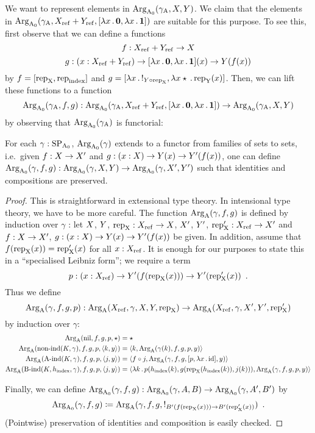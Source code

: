 \documentclass{article}
\begin{document}
We want to represent elements in $\text{Arg}_{\mathrm{A}_0}(\gamma_{\mathrm{A}}, X, Y)$. We claim that
the elements in $\text{Arg}_{\mathrm{A}_0}(\gamma_{\mathrm{A}}, X_{\mathrm{ref}} + Y_{\mathrm{ref}}, [\lambda x\,.\,\mathbf{0},
\lambda x\,.\,\mathbf{1}])$ are suitable for this purpose. To see this,
first observe that we can define a functions
\[
f : X_{\mathrm{ref}} + Y_{\mathrm{ref}} \to X
\]
%
%
\[
g : (x : X_{\mathrm{ref}} + Y_{\mathrm{ref}}) \to
    [\lambda x\,.\,\mathbf{0}, \lambda x\,.\,\mathbf{1}](x)
      \to Y(f(x))
\]
%
by $f = [\text{rep}_{\mathrm{X}}, \text{rep}_{\mathrm{index}}]$ and $g = [\lambda x\,.\,!_{Y \circ
  \text{rep}_{\mathrm{X}}}, \lambda x \star\,.\, \text{rep}_{\mathrm{Y}}(x)]$. Then, we can lift these
functions to a function
%
\[
\text{Arg}_{\mathrm{A}_0}(\gamma_{\mathrm{A}}, f, g) : \text{Arg}_{\mathrm{A}_0}(\gamma_{\mathrm{A}}, X_{\mathrm{ref}} +Y_{\mathrm{ref}}, [\lambda x\,.\,\mathbf{0}, \lambda x\,.\,\mathbf{1}]) \to
                       \text{Arg}_{\mathrm{A}_0}(\gamma_{\mathrm{A}}, X, Y)
\]
%
by observing that $\text{Arg}_{\mathrm{A}_0}(\gamma_{\mathrm{A}})$ is functorial:

\begin{lemma} %
  For each $\gamma : \text{SP}_{\mathrm{A}_0}$, $\text{Arg}_{\mathrm{A}_0}(\gamma)$ extends to a functor from
  families of sets to sets, i.e.\ given $f : X \to X'$ and $g : (x :
  X) \to Y(x) \to Y'(f(x))$, one can define $\text{Arg}_{\mathrm{A}_0}(\gamma, f, g) :
  \text{Arg}_{\mathrm{A}_0}(\gamma, X, Y) \to \text{Arg}_{\mathrm{A}_0}(\gamma, X', Y')$ such that identities
  and compositions are preserved.
\end{lemma}
\begin{proof}
  This is straightforward in extensional type theory. In intensional
  type theory, we have to be more careful. The function $\text{Arg}_{\mathrm{A}}(\gamma,
  f, g)$ is defined by induction over $\gamma$%
: let $X$,
  $Y$, $\text{rep}_{\mathrm{X}} : X_{\mathrm{ref}} \to X$, $X'$, $Y'$, $\text{rep}_{\mathrm{X}}' : X_{\mathrm{ref}} \to X'$ and
  $f : X \to X'$, $g : (x : X) \to Y(x) \to Y'(f(x))$ be given. In
  addition, assume that $f(\text{rep}_{\mathrm{X}}(x)) = \text{rep}_{\mathrm{X}}'(x)$ for all $x :
  X_{\mathrm{ref}}$. It is enough for our purposes to state this in a
  ``specialised Leibniz form''; we require a term
  \[
  p : (x : X_{\mathrm{ref}}) \to Y'(f(\text{rep}_{\mathrm{X}}(x))) \to Y'(\text{rep}_{\mathrm{X}}'(x)) \enspace .
  \]
  Thus we define
  \[
  \ArgA(\gamma, f, g, p) : %
  \ArgA(\Xref, \gamma, \A, \B, \repA)
  \to \ArgA(\Xref, \gamma, \A', \B', \repA')
  \]
  by induction over $\gamma$:
  \begin{align*}
    \text{Arg}_{\mathrm{A}}(\text{nil}, f, g, p, \star) &= \star\\
    \text{Arg}_{\mathrm{A}}(\text{non-ind}(K, \gamma), f, g, p, \langle k , y\rangle) &= \langle k , \text{Arg}_{\mathrm{A}}(\gamma(k), f, g, p, y)\rangle\\
    \text{Arg}_{\mathrm{A}}(\text{A-ind}(K, \gamma), f, g, p, \langle j , y\rangle) &= \langle f \circ j , \text{Arg}_{\mathrm{A}}(\gamma, f, g, [p, \lambda x\,.\,\text{id}], y)\rangle\\
    \text{Arg}_{\mathrm{A}}(\text{B-ind}(K, h_{\mathrm{index}}, \gamma), f, g, p, \langle j , y\rangle) &= \langle \lambda k\,.\,p(h_{\mathrm{index}}(k), g(\text{rep}_{\mathrm{X}}(h_{\mathrm{index}}(k)), j(k))) , \text{Arg}_{\mathrm{A}}(\gamma, f, g, p, y)\rangle
  \end{align*}
  
  Finally, we can define $\text{Arg}_{\mathrm{A}_0}(\gamma, f, g) : \text{Arg}_{\mathrm{A}_0}(\gamma, A, B) \to
  \text{Arg}_{\mathrm{A}_0}(\gamma, A', B')$ by
  \[
  \text{Arg}_{\mathrm{A}_0}(\gamma, f, g) \coloneqq \text{Arg}_{\mathrm{A}}(\gamma,f, g, !_{B'(f(\text{rep}_{\mathrm{X}}(x))) \to B'(\text{rep}_{\mathrm{X}}'(x))}) \enspace .
  \]
  (Pointwise) preservation of identities and composition is easily checked.
\end{proof}
\end{document}
